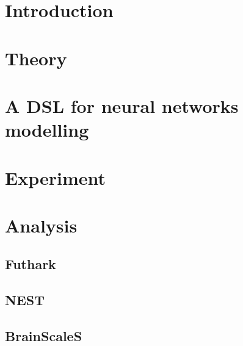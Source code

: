 \documentclass[a4paper,oneside]{memoir}
\begin{document}
\mainmatter
\chapter{Introduction} \label{sec:intro}
  

\chapter{Theory} \label{sec:theory}
  

\chapter{A DSL for neural networks modelling} \label{sec:dsl}
  

\chapter{Experiment} \label{sec:experiment}
  

\chapter{Analysis} \label{sec:analysis}
  \section{Futhark}
  \section{NEST}
  \section{BrainScaleS}

\end{document}
